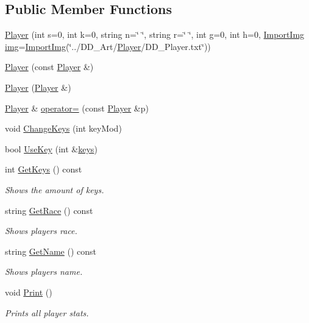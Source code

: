 \subsection*{Public Member Functions}
\begin{DoxyCompactItemize}
\item 
\hyperlink{classPlayer_a36d6f55c7bc6d95cf23d2439b9da19bb}{Player} (int s=0, int k=0, string n=\char`\"{} \char`\"{}, string r=\char`\"{} \char`\"{}, int g=0, int h=0, \hyperlink{classImportImg}{Import\-Img} \hyperlink{classCharacter_a3a0a90b2a43858b259912f659b8e0eea}{img}=\hyperlink{classImportImg}{Import\-Img}(\char`\"{}../D\-D\-\_\-\-Art/\hyperlink{classPlayer}{Player}/D\-D\-\_\-\-Player.\-txt\char`\"{}))
\item 
\hyperlink{classPlayer_a8826850c4f8a2871819713ef61148836}{Player} (const \hyperlink{classPlayer}{Player} \&)
\item 
\hyperlink{classPlayer_ad2d305f9af724e761a491b7a85a020e0}{Player} (\hyperlink{classPlayer}{Player} \&)
\item 
\hyperlink{classPlayer}{Player} \& \hyperlink{classPlayer_a104a89a5228f4d0b87b6e182fc5cb268}{operator=} (const \hyperlink{classPlayer}{Player} \&p)
\item 
void \hyperlink{classPlayer_af2f60260add77e68519783dec5400a9f}{Change\-Keys} (int key\-Mod)
\item 
bool \hyperlink{classPlayer_af839bdc1524d571568ea31a34f44f3ab}{Use\-Key} (int \&\hyperlink{classPlayer_ac46baa685ca2a266178f03b9e9877e65}{keys})
\item 
int \hyperlink{classPlayer_a1e9effacf495f5eabdf14a420e03eecd}{Get\-Keys} () const 
\begin{DoxyCompactList}\small\item\em Shows the amount of keys. \end{DoxyCompactList}\item 
string \hyperlink{classPlayer_a5b008e9aa1ebe834f022d4e3cfa958c6}{Get\-Race} () const 
\begin{DoxyCompactList}\small\item\em Shows players race. \end{DoxyCompactList}\item 
string \hyperlink{classPlayer_a5645669a3ad13ea99d194b85601e79ec}{Get\-Name} () const 
\begin{DoxyCompactList}\small\item\em Shows players name. \end{DoxyCompactList}\item 
void \hyperlink{classPlayer_a526ecf9587b1a537e48b5fca4d2997eb}{Print} ()
\begin{DoxyCompactList}\small\item\em Prints all player stats. \end{DoxyCompactList}\end{DoxyCompactItemize}
